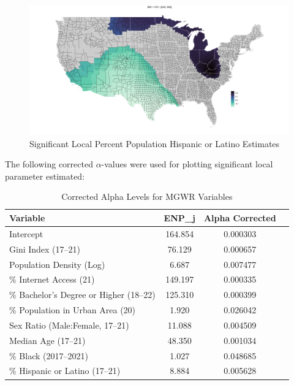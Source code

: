 \documentclass[
]{article}
\begin{document}
\begin{figure}[H]

{\centering \includegraphics[width=1\linewidth]{images/local-param/sig-pct-hisplat} 

}

\caption{Significant Local Percent Population Hispanic or Latino Estimates}\label{fig:unnamed-chunk-19}
\end{figure}

The following corrected \(\alpha\)-values were used for plotting
significant local parameter estimated:

\begin{table}[H]
\renewcommand{\arraystretch}{1.3} %
\setlength{\tabcolsep}{12pt} %
\centering
\caption{Corrected Alpha Levels for MGWR Variables}
\label{tab:variable_enps}
\begin{tabular}{lccc}
\hline
\textbf{Variable} & \textbf{ENP\_j} & \textbf{Alpha Corrected} \\ \hline
Intercept                 & 164.854 & 0.000303 \\ 
Gini Index (17–21)        & 76.129  & 0.000657 \\ 
Population Density (Log)  & 6.687   & 0.007477 \\ 
\% Internet Access (21)   & 149.197 & 0.000335 \\ 
\% Bachelor's Degree or Higher (18–22) & 125.310 & 0.000399 \\ 
\% Population in Urban Area (20) & 1.920 & 0.026042 \\ 
Sex Ratio (Male:Female, 17–21) & 11.088 & 0.004509 \\ 
Median Age (17–21)        & 48.350  & 0.001034 \\ 
\% Black (2017–2021)      & 1.027   & 0.048685 \\ 
\% Hispanic or Latino (17–21) & 8.884 & 0.005628 \\ 
\hline
\end{tabular}
\end{table}
\end{document}
